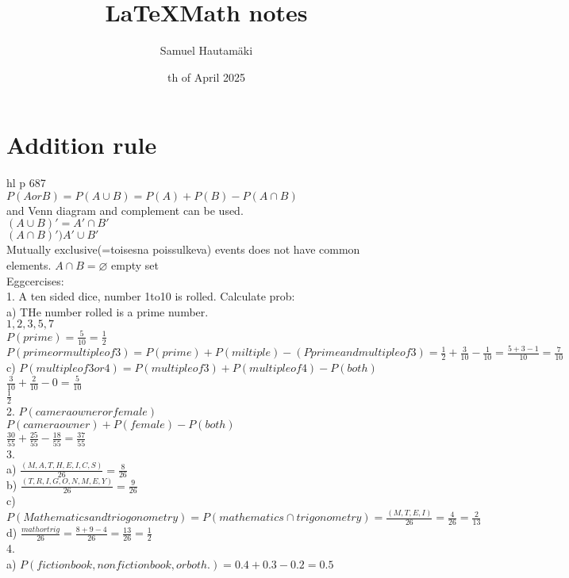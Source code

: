 \documentclass{article}
\title{\LaTeX Math notes}
\author{Samuel Hautamäki}
\date{th of April 2025}
\begin{document}
  \maketitle
   
  \section{Addition rule}
  hl p 687\\
  $P(A or B)=P(A\cup B)=P(A)+P(B)-P(A\cap B)$\\
  and Venn diagram and complement can be used.\\
  $(A \cup B)'=A'\cap B'$\\
  $(A \cap B)')A'\cup B'$\\
  Mutually exclusive(=toisesna poissulkeva) events does not have common elements. $A\cap B=\varnothing$ empty set\\
  Eggcercises:\\
  1. A ten sided dice, number 1to10 is rolled. Calculate prob:\\
  a) THe number rolled is a prime number.\\
  $1,2,3,5,7$\\
  $P(prime)=\frac{5}{10}=\frac{1}{2}$\\
  $P(prime or multiple o f3)=P(prime)+P(miltiple)-(Pprime and multiple of 3)=\frac{1}{2}+\frac{3}{10}-\frac{1}{10}=\frac{5+3-1}{10}=\frac{7}{10}$\\
  c) $P(multiple of 3 or 4)=P(multiple of 3)+P(multiple  of 4)-P(both)$\\
  $\frac{3}{10}+\frac{2}{10}-0=\frac{5}{10}$\\
  $\frac{1}{2}$\\
  2. $P(camera owner or female)$\\
  $P(camera owner)+P(female)-P(both)$\\
  $\frac{30}{55}+\frac{25}{55}-\frac{18}{55}=\frac{37}{55}$\\
  3. \\
  a) $\frac{(M,A,T,H,E,I,C,S)}{26}=\frac{8}{26}$\\
  b) $\frac{(T,R,I,G,O,N,M,E,Y)}{26}=\frac{9}{26}$\\
  c) $P(Mathematics and triogonometry)=P(mathematics \cap trigonometry)=\frac{(M,T,E,I)}{26}=\frac{4}{26}=\frac{2}{13}$\\
  d) $\frac{math or trig}{26}=\frac{8+9-4}{26}=\frac{13}{26}=\frac{1}{2}$\\
  4. \\
  a) $P(fiction book, non fiction book, or both.)=0.4+0.3-0.2=0.5$\\
\end{document}

